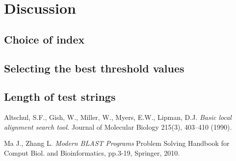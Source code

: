 \documentclass[12pt]{IEEEtran}
\begin{document}
\section{Discussion}

\subsection{Choice of index}

\subsection{Selecting the best threshold values}


\subsection{Length of test strings}



\begin{thebibliography}{9}

Altschul, S.F., Gish, W., Miller, W., Myers, E.W., Lipman, D.J. 
\emph{Basic local alignment search tool. }
Journal of Molecular Biology 215(3), 403–410 (1990).

Ma J., Zhang L.
\emph{Modern BLAST Programs}
Problem Solving Handbook for Comput Biol. and Bioinformatics, pp.3-19, Springer, 2010.


\end{thebibliography}
\end{document}
